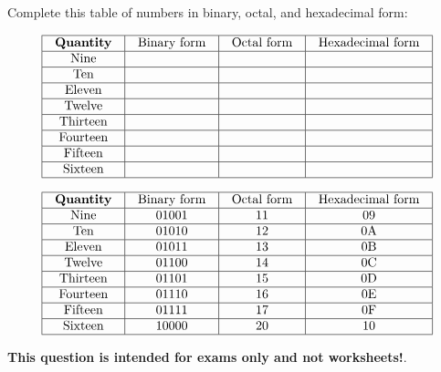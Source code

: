 

Complete this table of numbers in binary, octal, and hexadecimal form:


$$\vbox{\offinterlineskip
\halign{\strut
\vrule \quad\hfil # \ \hfil & 
\vrule \quad\hfil # \ \hfil & 
\vrule \quad\hfil # \ \hfil & 
\vrule \quad\hfil # \ \hfil \vrule \cr
\noalign{\hrule}
%
{\bf Quantity} & Binary form & Octal form & Hexadecimal form \cr
%
\noalign{\hrule}
%
Nine &  &  &  \cr
%
\noalign{\hrule}
%
Ten &  &  &  \cr
%
\noalign{\hrule}
%
Eleven &  &  &  \cr
%
\noalign{\hrule}
%
Twelve &  &  &  \cr
%
\noalign{\hrule}
%
Thirteen &  &  &  \cr
%
\noalign{\hrule}
%
Fourteen &  &  &  \cr
%
\noalign{\hrule}
%
Fifteen &  &  &  \cr
%
\noalign{\hrule}
%
Sixteen &  &  &  \cr
%
\noalign{\hrule}
} %
}$$ %








$$\vbox{\offinterlineskip
\halign{\strut
\vrule \quad\hfil # \ \hfil & 
\vrule \quad\hfil # \ \hfil & 
\vrule \quad\hfil # \ \hfil & 
\vrule \quad\hfil # \ \hfil \vrule \cr
\noalign{\hrule}
%
{\bf Quantity} & Binary form & Octal form & Hexadecimal form \cr
%
\noalign{\hrule}
%
Nine & 01001 & 11 & 09 \cr
%
\noalign{\hrule}
%
Ten & 01010 & 12 & 0A \cr
%
\noalign{\hrule}
%
Eleven & 01011 & 13 & 0B \cr
%
\noalign{\hrule}
%
Twelve & 01100 & 14 & 0C \cr
%
\noalign{\hrule}
%
Thirteen & 01101 & 15 & 0D \cr
%
\noalign{\hrule}
%
Fourteen & 01110 & 16 & 0E \cr
%
\noalign{\hrule}
%
Fifteen & 01111 & 17 & 0F \cr
%
\noalign{\hrule}
%
Sixteen & 10000 & 20 & 10 \cr
%
\noalign{\hrule}
} %
}$$ %







{\bf This question is intended for exams only and not worksheets!}.




